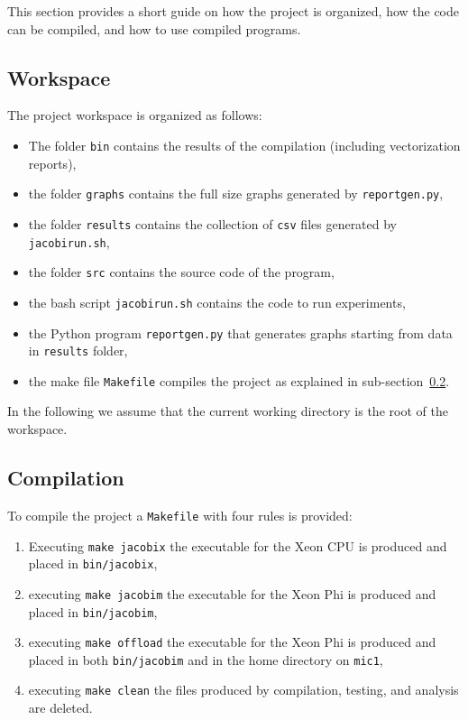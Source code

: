 This section provides a short guide on how the project is organized, how the code can be compiled, and how to use compiled programs.

\subsection{Workspace}
The project workspace is organized as follows:
\begin{itemize}
	\item The folder \verb|bin| contains the results of the compilation (including vectorization reports),
	\item the folder \verb|graphs| contains the full size graphs generated by \verb|reportgen.py|,
	\item the folder \verb|results| contains the collection of \verb|csv| files generated by \verb|jacobirun.sh|,
	\item the folder \verb|src| contains the source code of the program,
	\item the bash script \verb|jacobirun.sh| contains the code to run experiments,
	\item the Python program \verb|reportgen.py| that generates graphs starting from data in \verb|results| folder,
	\item the make file \verb|Makefile| compiles the project as explained in sub-section~\ref{subsec:compilation}.
\end{itemize}
In the following we assume that the current working directory is the root of the workspace.

\subsection{Compilation}\label{subsec:compilation}
To compile the project a \verb|Makefile| with four rules is provided:
\begin{enumerate}
	\item Executing \verb|make jacobix| the executable for the Xeon CPU is produced and placed in \verb|bin/jacobix|,
	\item executing \verb|make jacobim| the executable for the Xeon Phi is produced and placed in \verb|bin/jacobim|,
	\item executing \verb|make offload| the executable for the Xeon Phi is produced and placed in both \verb|bin/jacobim| and in the home directory on \verb|mic1|,
	\item executing \verb|make clean| the files produced by compilation, testing, and analysis are deleted.
\end{enumerate}

